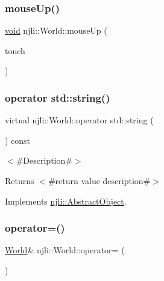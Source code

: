 \mbox{\label{classnjli_1_1_world_a4f3f72ae362ffc3aa5636d30dd84224e}} 
\subsubsection{\texorpdfstring{mouse\+Up()}{mouseUp()}}
{\footnotesize\ttfamily \mbox{\hyperlink{_thread_8h_af1e856da2e658414cb2456cb6f7ebc66}{void}} njli\+::\+World\+::mouse\+Up (\begin{DoxyParamCaption}\item[{const \mbox{\hyperlink{classnjli_1_1_device_mouse}{Device\+Mouse}} \&}]{touch }\end{DoxyParamCaption})}

\mbox{\label{classnjli_1_1_world_a2a892d17f7e21b51784e45ecc4aa642e}} 
\subsubsection{\texorpdfstring{operator std\+::string()}{operator std::string()}}
{\footnotesize\ttfamily virtual njli\+::\+World\+::operator std\+::string (\begin{DoxyParamCaption}{ }\end{DoxyParamCaption}) const\hspace{0.3cm}{\ttfamily [virtual]}}

$<$\#\+Description\#$>$

\begin{DoxyReturn}{Returns}
$<$\#return value description\#$>$ 
\end{DoxyReturn}


Implements \mbox{\hyperlink{classnjli_1_1_abstract_object_afc07f4138bd3003910e7aa7fa0fe11ad}{njli\+::\+Abstract\+Object}}.

\mbox{\label{classnjli_1_1_world_a2fe83dc2d899a91ef21ac20220e2ada4}} 
\subsubsection{\texorpdfstring{operator=()}{operator=()}}
{\footnotesize\ttfamily \mbox{\hyperlink{classnjli_1_1_world}{World}}\& njli\+::\+World\+::operator= (\begin{DoxyParamCaption}\item[{const \mbox{\hyperlink{classnjli_1_1_world}{World}} \&}]{ }\end{DoxyParamCaption})\hspace{0.3cm}{\ttfamily [private]}}

